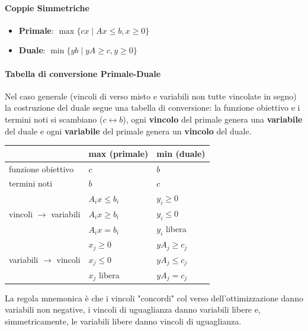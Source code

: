 \documentclass[12pt]{extarticle} %
\begin{document}
\paragraph{Coppie Simmetriche}
\begin{itemize}
    \item \textbf{Primale}: $\max \{cx \mid Ax \le b, x \ge 0\}$
    \item \textbf{Duale}: $\min \{yb \mid yA \ge c, y \ge 0\}$
\end{itemize}

\paragraph{Tabella di conversione Primale-Duale}
Nel caso generale (vincoli di verso misto e variabili non tutte vincolate in segno) la costruzione del duale segue una tabella di conversione: la funzione obiettivo e i termini noti si scambiano ($c \leftrightarrow b$), ogni \textbf{vincolo} del primale genera una \textbf{variabile} del duale e ogni \textbf{variabile} del primale genera un \textbf{vincolo} del duale.
\begin{center}
\begin{tabular}{lll}
\hline
 & \textbf{max} (primale) & \textbf{min} (duale) \\
\hline
funzione obiettivo & $c$ & $b$ \\
termini noti & $b$ & $c$ \\
\hline
\multirow{3}{*}{vincoli $\to$ variabili} & $A_i x \le b_i$ & $y_i \ge 0$ \\
 & $A_i x \ge b_i$ & $y_i \le 0$ \\
 & $A_i x = b_i$ & $y_i$ libera \\
\hline
\multirow{3}{*}{variabili $\to$ vincoli} & $x_j \ge 0$ & $yA_j \ge c_j$ \\
 & $x_j \le 0$ & $yA_j \le c_j$ \\
 & $x_j$ libera & $yA_j = c_j$ \\
\hline
\end{tabular}
\end{center}
La regola mnemonica è che i vincoli "concordi" col verso dell'ottimizzazione danno variabili non negative, i vincoli di uguaglianza danno variabili libere e, simmetricamente, le variabili libere danno vincoli di uguaglianza.
\end{document}
